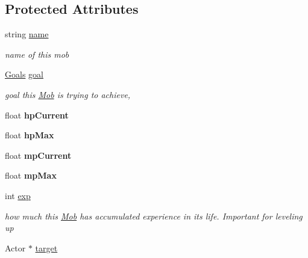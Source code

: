 \subsection*{Protected Attributes}
\begin{DoxyCompactItemize}
\item 
string \hyperlink{class_mob_a1adcb405b2a4647bfb2471b1283b9477}{name}\hypertarget{class_mob_a1adcb405b2a4647bfb2471b1283b9477}{}\label{class_mob_a1adcb405b2a4647bfb2471b1283b9477}

\begin{DoxyCompactList}\small\item\em name of this mob \end{DoxyCompactList}\item 
\hyperlink{class_mob_a886346a9f913203df0797f2c84dd8962}{Goals} \hyperlink{class_mob_ad6c2e1b70a39551fd39b25002dac55b1}{goal}
\begin{DoxyCompactList}\small\item\em goal this \hyperlink{class_mob}{Mob} is trying to achieve, \end{DoxyCompactList}\item 
float {\bfseries hp\+Current}\hypertarget{class_mob_a5a84c7649f3774da15780caa9f21aabc}{}\label{class_mob_a5a84c7649f3774da15780caa9f21aabc}

\item 
float {\bfseries hp\+Max}\hypertarget{class_mob_ac2a881584e2fa3224da656a775f17284}{}\label{class_mob_ac2a881584e2fa3224da656a775f17284}

\item 
float {\bfseries mp\+Current}\hypertarget{class_mob_ae1388056fe541060e8c1607ae561801f}{}\label{class_mob_ae1388056fe541060e8c1607ae561801f}

\item 
float {\bfseries mp\+Max}\hypertarget{class_mob_a8156e952a713baa462990ce635bf9ae8}{}\label{class_mob_a8156e952a713baa462990ce635bf9ae8}

\item 
int \hyperlink{class_mob_a30bc4209cc6c6294cd3c68943317e682}{exp}\hypertarget{class_mob_a30bc4209cc6c6294cd3c68943317e682}{}\label{class_mob_a30bc4209cc6c6294cd3c68943317e682}

\begin{DoxyCompactList}\small\item\em how much this \hyperlink{class_mob}{Mob} has accumulated experience in it\textquotesingle{}s life. Important for leveling up \end{DoxyCompactList}\item 
Actor $\ast$ \hyperlink{class_mob_a1bf86299dea0aa82c773a3b8d04d0593}{target}\hypertarget{class_mob_a1bf86299dea0aa82c773a3b8d04d0593}{}\label{class_mob_a1bf86299dea0aa82c773a3b8d04d0593}


\end{DoxyCompactItemize}
